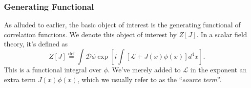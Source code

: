 \subsubsection{Generating Functional}

As alluded to earlier, the basic object of interest is the
generating functional of correlation functions. We denote this
object of interest by $Z[J]$. In a scalar field theory, it's
defined as
\begin{equation}\label{eq:scalarFieldTheoryGeneratingFunctional}
Z[J] \stackrel{\text{def}}{=}\int\mathcal{D}\phi\exp\left[
i\int[\mathcal{L}+J(x)\phi(x)]d^{4}x
\right].
\end{equation}
This is a functional integral over $\phi$. We've merely added to
$\mathcal{L}$ in the exponent an extra term $J(x)\phi(x)$, which
we usually refer to as the ``\emph{source term}''.

